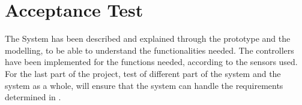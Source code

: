 \chapter{Acceptance Test}\label{cha:AcceptTest}

The System has been described and explained through the prototype and the modelling, to be able to understand the functionalities needed. The controllers have been implemented for the functions needed, according to the sensors used. For the last part of the project, test of  different part of the system and the system as a whole, will ensure that the system can handle the requirements determined in .